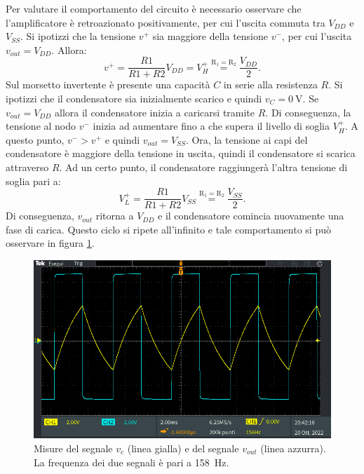 \noindent
Per valutare il comportamento del circuito è necessario osservare che l'amplificatore è retroazionato positivamente, per cui l'uscita commuta tra $V_{DD}$ e $V_{SS}$. Si ipotizzi che la tensione $v^+$ sia maggiore della tensione $v^-$, per cui l'uscita $v_{out} = V_{DD}$. Allora:
\begin{equation}
	v^+ = \frac{R1}{R1+R2} V_{DD} = V_H^+\overset{\mathrm{R_1=R_2}}{=}\frac{V_{DD}}{2}.
\end{equation}
Sul morsetto invertente è presente una capacità $C$ in serie alla resistenza $R$. Si ipotizzi che il condensatore sia inizialmente scarico e quindi $v_C = \SI{0}{\volt}$. Se $v_{out} = V_{DD}$ allora il condensatore inizia a caricarsi tramite $R$. Di conseguenza, la tensione al nodo $v^-$ inizia ad aumentare fino a che supera il livello di soglia $V_H^+$. A questo punto, $v^- > v^+$ e quindi $v_{out} = V_{SS}$. Ora, la tensione ai capi del condensatore è maggiore della tensione in uscita, quindi il condensatore si scarica attraverso $R$. Ad un certo punto, il condensatore raggiungerà l'altra tensione di soglia pari a:
\begin{equation}
	V_L^+ = \frac{R1}{R1+R2} V_{SS}\overset{\mathrm{R_1=R_2}}{=}\frac{V_{SS}}{2}.
\end{equation}
Di conseguenza, $v_{out}$ ritorna a $V_{DD}$ e il condensatore comincia nuovamente una fase di carica. Questo ciclo si ripete all'infinito e tale comportamento si può osservare in figura \ref{fig:oscillatore}.

\begin{figure}[h!]
	\centering
	\includegraphics[width=\linewidth]{./ImageFiles/Laboratorio 3/TEK00013.PNG}
	\caption{Misure del segnale $v_{c}$ (linea gialla) e del segnale $v_{out}$ (linea azzurra). La frequenza dei due segnali è pari a \SI{158}{\hertz}.}
	\label{fig:oscillatore}
\end{figure}

